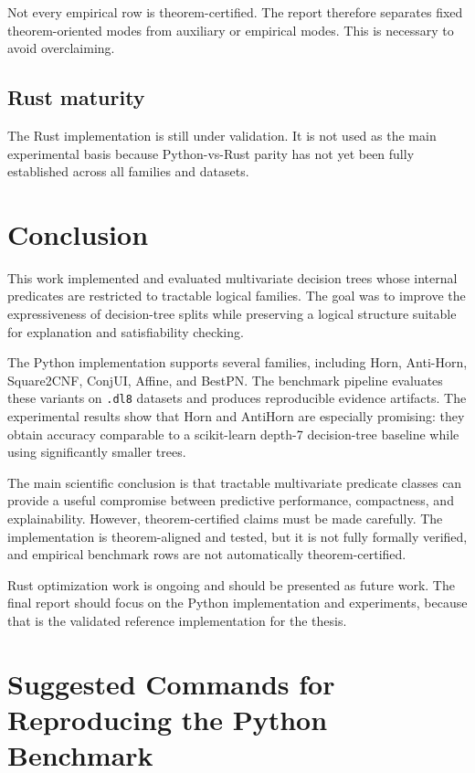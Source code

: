 \documentclass[11pt,a4paper]{article}
\begin{document}
Not every empirical row is theorem-certified. The report therefore separates fixed theorem-oriented modes from auxiliary or empirical modes. This is necessary to avoid overclaiming.

\subsection{Rust maturity}

The Rust implementation is still under validation. It is not used as the main experimental basis because Python-vs-Rust parity has not yet been fully established across all families and datasets.

\section{Conclusion}

This work implemented and evaluated multivariate decision trees whose internal predicates are restricted to tractable logical families. The goal was to improve the expressiveness of decision-tree splits while preserving a logical structure suitable for explanation and satisfiability checking.

The Python implementation supports several families, including Horn, Anti-Horn, Square2CNF, ConjUI, Affine, and BestPN. The benchmark pipeline evaluates these variants on \texttt{.dl8} datasets and produces reproducible evidence artifacts. The experimental results show that Horn and AntiHorn are especially promising: they obtain accuracy comparable to a scikit-learn depth-7 decision-tree baseline while using significantly smaller trees.

The main scientific conclusion is that tractable multivariate predicate classes can provide a useful compromise between predictive performance, compactness, and explainability. However, theorem-certified claims must be made carefully. The implementation is theorem-aligned and tested, but it is not fully formally verified, and empirical benchmark rows are not automatically theorem-certified.

Rust optimization work is ongoing and should be presented as future work. The final report should focus on the Python implementation and experiments, because that is the validated reference implementation for the thesis.

\appendix

\section{Suggested Commands for Reproducing the Python Benchmark}
\end{document}
